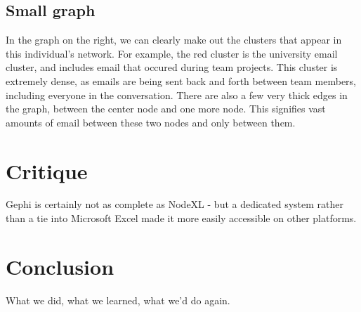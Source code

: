 \documentclass[11pt,letterpaper]{article}
\begin{document}
\subsection*{Small graph}
In the graph on the right, we can clearly make out the clusters that appear in this individual's network. For example, the red cluster is the university email cluster, and includes email that occured during team projects. This cluster is extremely dense, as emails are being sent back and forth between team members, including everyone in the conversation. There are also a few very thick edges in the graph, between the center node and one more node. This signifies vast amounts of email between these two nodes and only between them.


\section*{Critique}

Gephi is certainly not as complete as NodeXL - but a dedicated system rather than a tie into Microsoft Excel made it more easily accessible on other platforms.

\section*{Conclusion}

What we did, what we learned, what we'd do again.



\end{document}
